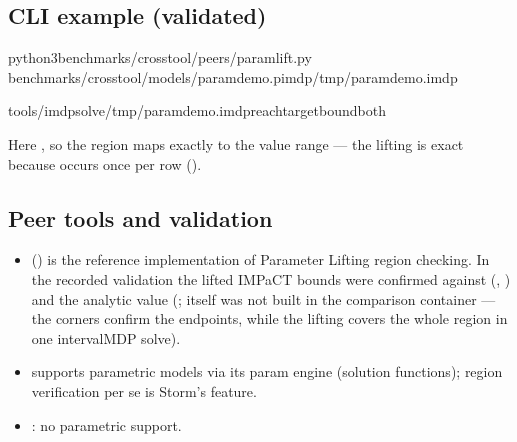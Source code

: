 \documentclass[a4paper,10pt,english]{sphinxmanual}
\begin{document}
\subsection{CLI example (validated)}
\label{\detokenize{manual/parametric:cli-example-validated}}
\begin{sphinxVerbatim}[commandchars=\\\{\}]
python3benchmarks/crosstool/peers/param\PYGZus{}lift.py
benchmarks/crosstool/models/param\PYGZus{}demo.pimdp\PYGZgt{}/tmp/param\PYGZus{}demo.imdp

tools/imdp\PYGZus{}solve/tmp/param\PYGZus{}demo.imdpreachtarget\PYGZhy{}\PYGZhy{}boundboth
\end{sphinxVerbatim}

\sphinxAtStartPar
Here , so the region \sphinxcode{\sphinxupquote{{[}0.3, 0.7{]}}} maps exactly to the value range
\sphinxcode{\sphinxupquote{{[}0.3, 0.7{]}}} — the lifting is exact because  occurs once per row
().


\subsection{Peer tools and validation}
\label{\detokenize{manual/parametric:peer-tools-and-validation}}\begin{itemize}
\item {} 
\sphinxAtStartPar
{} () is the reference implementation of Parameter Lifting region
checking. In the recorded validation the lifted IMPaCT bounds \sphinxcode{\sphinxupquote{{[}0.3, 0.7{]}}} were
confirmed against  (, ) and
the analytic value (;  itself was not built in the
comparison container — the corners confirm the endpoints, while the lifting covers
the whole region in one interval\sphinxhyphen{}MDP solve).

\item {} 
\sphinxAtStartPar
{} supports parametric models via its param engine (solution functions);
region verification per se is Storm’s feature.

\item {} 
\sphinxAtStartPar
{}: no parametric support.

\end{itemize}
\end{document}
